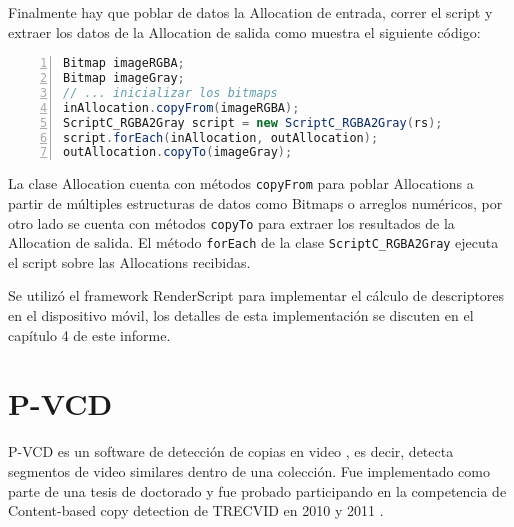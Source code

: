 Finalmente hay que poblar de datos la Allocation de entrada, correr el script y extraer los datos de la Allocation de salida como muestra el siguiente código:

\begin{lstlisting}[language=Java, frame=bt, numbers=left]
Bitmap imageRGBA;
Bitmap imageGray;
// ... inicializar los bitmaps
inAllocation.copyFrom(imageRGBA);
ScriptC_RGBA2Gray script = new ScriptC_RGBA2Gray(rs);
script.forEach(inAllocation, outAllocation);
outAllocation.copyTo(imageGray);
\end{lstlisting}

La clase Allocation cuenta con métodos \texttt{copyFrom} para poblar Allocations a partir de múltiples estructuras de datos como Bitmaps o arreglos numéricos, por otro lado se cuenta con métodos \texttt{copyTo} para extraer los resultados de la Allocation de salida. El método \texttt{forEach} de la clase \texttt{ScriptC\_RGBA2Gray} ejecuta el script sobre las Allocations recibidas.

Se utilizó el framework RenderScript para implementar el cálculo de descriptores en el dispositivo móvil, los detalles de esta implementación se discuten en el capítulo 4 de este informe.

\section{P-VCD}\label{pvcd}
P-VCD es un software de detección de copias en video \cite{p-vcd1}, es decir, detecta segmentos de video similares dentro de una colección. Fue implementado como parte de una tesis de doctorado y fue probado participando en la competencia de Content-based copy detection de TRECVID en 2010 y 2011 \cite{p-vcd2}.


